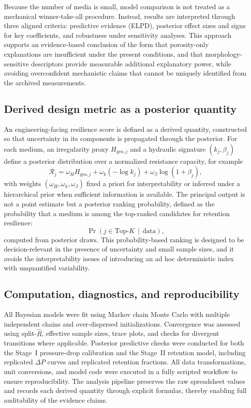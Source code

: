 \documentclass[12pt,a4paper]{article}
\begin{document}
Because the number of media is small, model comparison is not treated as a mechanical winner-take-all procedure. Instead, results are interpreted through three aligned criteria: predictive evidence (ELPD), posterior effect sizes and signs for key coefficients, and robustness under sensitivity analyses. This approach supports an evidence-based conclusion of the form that porosity-only explanations are insufficient under the present conditions, and that morphology-sensitive descriptors provide measurable additional explanatory power, while avoiding overconfident mechanistic claims that cannot be uniquely identified from the archived measurements.

\subsection{Derived design metric as a posterior quantity}
An engineering-facing resilience score is defined as a derived quantity, constructed so that uncertainty in its components is propagated through the posterior. For each medium, an irregularity proxy $H_{\mathrm{geo},j}$ and a hydraulic signature $(k_j,\beta_j)$ define a posterior distribution over a normalized resistance capacity, for example
\begin{equation}
\mathcal{R}_j = \omega_H H_{\mathrm{geo},j} + \omega_k(-\log k_j) + \omega_\beta \log(1+\beta_j),
\end{equation}
with weights $(\omega_H,\omega_k,\omega_\beta)$ fixed a priori for interpretability or inferred under a hierarchical prior when sufficient information is available. The principal output is not a point estimate but a posterior ranking probability, defined as the probability that a medium is among the top-ranked candidates for retention resilience:
\begin{equation}
\Pr\!\left(j \in \mathrm{Top}\text{-}K \,\middle|\, \text{data}\right),
\end{equation}
computed from posterior draws. This probability-based ranking is designed to be decision-relevant in the presence of uncertainty and small sample sizes, and it avoids the interpretability issues of introducing an ad hoc deterministic index with unquantified variability.

\subsection{Computation, diagnostics, and reproducibility}
All Bayesian models were fit using Markov chain Monte Carlo with multiple independent chains and over-dispersed initializations. Convergence was assessed using split-$\hat{R}$, effective sample sizes, trace plots, and checks for divergent transitions where applicable. Posterior predictive checks were conducted for both the Stage~I pressure-drop calibration and the Stage~II retention model, including replicated $\Delta P$ curves and replicated retention fractions. All data transformations, unit conversions, and model code were executed in a fully scripted workflow to ensure reproducibility. The analysis pipeline preserves the raw spreadsheet values and records each derived quantity through explicit formulas, thereby enabling full auditability of the evidence claims.
\end{document}
